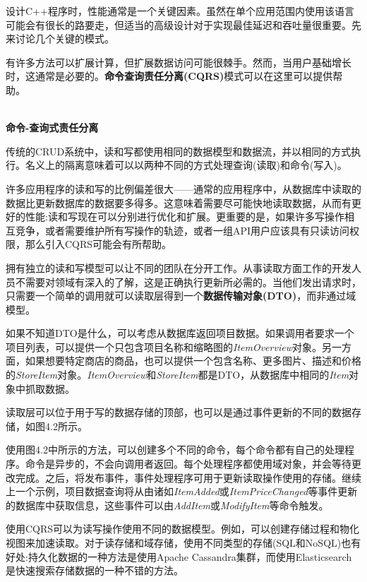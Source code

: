 
设计C++程序时，性能通常是一个关键因素。虽然在单个应用范围内使用该语言可能会有很长的路要走，但适当的高级设计对于实现最佳延迟和吞吐量很重要。先来讨论几个关键的模式。


有许多方法可以扩展计算，但扩展数据访问可能很棘手。然而，当用户基础增长时，这通常是必要的。\textbf{命令查询责任分离(CQRS)}模式可以在这里可以提供帮助。

\hspace*{\fill} \\ %
\noindent
\textbf{命令-查询式责任分离}

传统的CRUD系统中，读和写都使用相同的数据模型和数据流，并以相同的方式执行。名义上的隔离意味着可以以两种不同的方式处理查询(读取)和命令(写入)。

许多应用程序的读和写的比例偏差很大——通常的应用程序中，从数据库中读取的数据比更新数据库的数据要多得多。这意味着需要尽可能快地读取数据，从而有更好的性能:读和写现在可以分别进行优化和扩展。更重要的是，如果许多写操作相互竞争，或者需要维护所有写操作的轨迹，或者一组API用户应该具有只读访问权限，那么引入CQRS可能会有所帮助。

拥有独立的读和写模型可以让不同的团队在分开工作。从事读取方面工作的开发人员不需要对领域有深入的了解，这是正确执行更新所必需的。当他们发出请求时，只需要一个简单的调用就可以读取层得到一个\textbf{数据传输对象(DTO)}，而非通过域模型。

如果不知道DTO是什么，可以考虑从数据库返回项目数据。如果调用者要求一个项目列表，可以提供一个只包含项目名称和缩略图的\textit{ItemOverview}对象。另一方面，如果想要特定商店的商品，也可以提供一个包含名称、更多图片、描述和价格的\textit{StoreItem}对象。\textit{ItemOverview}和\textit{StoreItem}都是DTO，从数据库中相同的\textit{Item}对象中抓取数据。

读取层可以位于用于写的数据存储的顶部，也可以是通过事件更新的不同的数据存储，如图4.2所示。

使用图4.2中所示的方法，可以创建多个不同的命令，每个命令都有自己的处理程序。命令是异步的，不会向调用者返回。每个处理程序都使用域对象，并会等待更改完成。之后，将发布事件，事件处理程序可用于更新读取操作使用的存储。继续上一个示例，项目数据查询将从由诸如\textit{ItemAdded}或\textit{ItemPriceChanged}等事件更新的数据库中获取信息，这些事件可以由\textit{AddItem}或\textit{ModifyItem}等命令触发。

使用CQRS可以为读写操作使用不同的数据模型。例如，可以创建存储过程和物化视图来加速读取。对于读存储和域存储，使用不同类型的存储(SQL和NoSQL)也有好处:持久化数据的一种方法是使用Apache Cassandra集群，而使用Elasticsearch是快速搜索存储数据的一种不错的方法。

